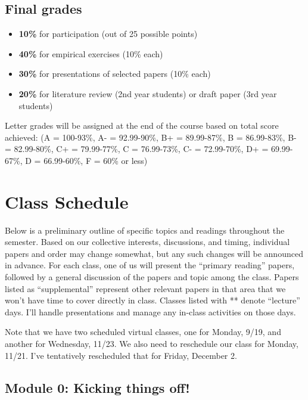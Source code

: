 \documentclass[11pt,]{article}
\begin{document}
\hypertarget{final-grades}{%
\subsection{Final grades}\label{final-grades}}

\begin{itemize}
\item
  \textbf{10\%} for participation (out of 25 possible points)
\item
  \textbf{40\%} for empirical exercises (10\% each)
\item
  \textbf{30\%} for presentations of selected papers (10\% each)
\item
  \textbf{20\%} for literature review (2nd year students) or draft paper
  (3rd year students)
\end{itemize}

Letter grades will be assigned at the end of the course based on total
score achieved: (A = 100-93\%, A- = 92.99-90\%, B+ = 89.99-87\%, B =
86.99-83\%, B- = 82.99-80\%, C+ = 79.99-77\%, C = 76.99-73\%, C- =
72.99-70\%, D+ = 69.99-67\%, D = 66.99-60\%, F = 60\% or less)

\newpage

\hypertarget{class-schedule}{%
\section{Class Schedule}\label{class-schedule}}

Below is a preliminary outline of specific topics and readings
throughout the semester. Based on our collective interests, discussions,
and timing, individual papers and order may change somewhat, but any
such changes will be announced in advance. For each class, one of us
will present the ``primary reading'' papers, followed by a general
discussion of the papers and topic among the class. Papers listed as
``supplemental'' represent other relevant papers in that area that we
won't have time to cover directly in class. Classes listed with **
denote ``lecture'' days. I'll handle presentations and manage any
in-class activities on those days.

Note that we have two scheduled virtual classes, one for Monday, 9/19,
and another for Wednesday, 11/23. We also need to reschedule our class
for Monday, 11/21. I've tentatively rescheduled that for Friday,
December 2.

\hypertarget{module-0-kicking-things-off}{%
\subsection{Module 0: Kicking things
off!}\label{module-0-kicking-things-off}}
\end{document}
